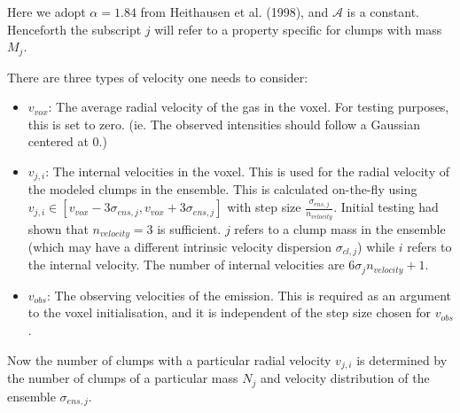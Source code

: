 \documentclass[a4paper]{article}
\newcommand{\kosmatau}{KOSMA-\(\tau\)}
\begin{document}
    Here we adopt \(\alpha=1.84\) from Heithausen et al. (1998), and \(\mathcal{A}\) is a constant.
    Henceforth the subscript \(j\) will refer to a property specific for clumps with mass \(M_j\).

    There are three types of velocity one needs to consider:

    \begin{itemize}
        \item \(v_{vox}\): The average radial velocity of the gas in the voxel. For testing purposes, this is set to zero. (ie. The observed intensities should follow a Gaussian centered at 0.)
        \item \(v_{j,i}\): The internal velocities in the voxel. This is used for the radial velocity of the modeled clumps in the ensemble. This is calculated on-the-fly using \(v_{j,i} \in [v_{vox} - 3 \sigma_{ens,j}, v_{vox} + 3 \sigma_{ens,j}]\) with step size \(\frac{\sigma_{ens,j}}{n_{velocity}}\). Initial testing had shown that \(n_{velocity} = 3\) is sufficient. \(j\) refers to a clump mass in the ensemble (which may have a different intrinsic velocity dispersion \(\sigma_{cl,j}\)) while \(i\) refers to the internal velocity. The number of internal velocities are \(6 \sigma_j n_{velocity} + 1\).
        \item \(v_{obs}\): The observing velocities of the emission. This is required as an argument to the voxel initialisation, and it is independent of the step size chosen for \(v_{obs}\).
    \end{itemize}

    Now the number of clumps with a particular radial velocity \(v_{j,i}\) is determined by the number of clumps of a particular mass \(N_j\) and velocity distribution of the ensemble \(\sigma_{ens,j}\).
\end{document}
